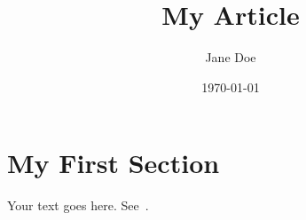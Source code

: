 \documentclass[language=english]{phoebe}
\title{My Article}
\author{Jane Doe}
\date{\today}
\begin{document}
\maketitle

\section{My First Section}

Your text goes here. See~\citet{article}.

\begingroup
\RaggedRight
\printbibliography
\endgroup
\end{document}
